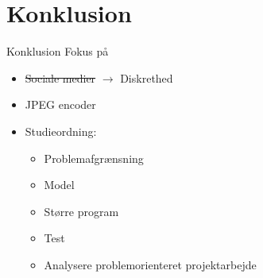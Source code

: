 \section{Konklusion}
\begin{frame}{Konklusion}
    Fokus på
    \begin{itemize}
        \item{\sout{Sociale medier} $\rightarrow$ Diskrethed}
        \item JPEG encoder
        \item Studieordning:
        \begin{itemize}
            \item\textcolor{green}{\checkmark} Problemafgrænsning
            \item\textcolor{green}{\checkmark} Model
            \item\textcolor{green}{\checkmark} Større program
            \item\textcolor{green}{\checkmark} Test
            \item\textcolor{green}{\checkmark} Analysere problemorienteret projektarbejde
            \end{itemize}
    \end{itemize}
\end{frame}
